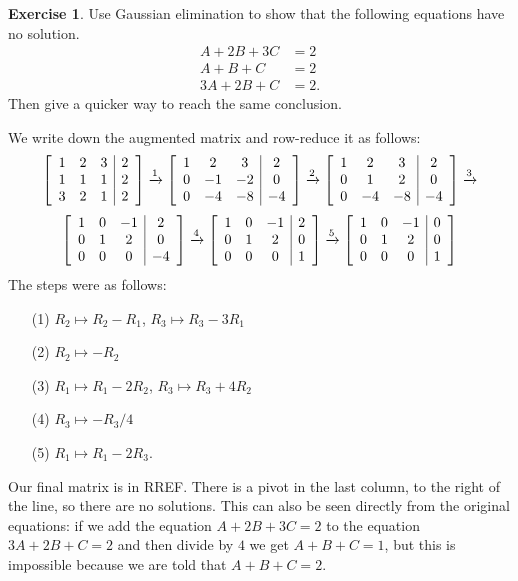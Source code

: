 \documentclass[a4paper]{book}
\theoremstyle{definition}
\newtheorem{exercise}[theorem]{Exercise}
\renewenvironment{solution}{\SolutionInline}{\endSolutionInline}
\begin{document}
\begin{exercise}
 Use Gaussian elimination to show that the following equations have no
 solution. 
 \begin{align*}
  A+2B+3C &= 2 \\
  A+B+C   &= 2 \\
  3A+2B+C &= 2.
 \end{align*}
 Then give a quicker way to reach the same conclusion.
\end{exercise}
\begin{solution}
 We write down the augmented matrix and row-reduce it as follows:
 {\small \[
  \left[\begin{array}{ccc|c}
    1 &  2 &  3 &  2 \\
    1 &  1 &  1 &  2 \\
    3 &  2 &  1 &  2
  \end{array}\right]
  \xrightarrow{1}
  \left[\begin{array}{ccc|c}
    1 &  2 &  3 &  2 \\
    0 & -1 & -2 &  0 \\
    0 & -4 & -8 & -4
  \end{array}\right]
  \xrightarrow{2}
  \left[\begin{array}{ccc|c}
    1 &  2 &  3 &  2 \\
    0 &  1 &  2 &  0 \\
    0 & -4 & -8 & -4
  \end{array}\right]
  \xrightarrow{3}
  \] \[ 
  \left[\begin{array}{ccc|c}
    1 &  0 & -1 &  2 \\
    0 &  1 &  2 &  0 \\
    0 &  0 &  0 & -4
  \end{array}\right]
  \xrightarrow{4}
  \left[\begin{array}{ccc|c}
    1 &  0 & -1 &  2 \\
    0 &  1 &  2 &  0 \\
    0 &  0 &  0 &  1
  \end{array}\right]
  \xrightarrow{5}
  \left[\begin{array}{ccc|c}
    1 &  0 & -1 &  0 \\
    0 &  1 &  2 &  0 \\
    0 &  0 &  0 &  1
  \end{array}\right]
 \]}
 The steps were as follows:
 \begin{itemize}
  \item[(1)] $R_2\mapsto R_2-R_1$, $R_3\mapsto R_3-3R_1$
  \item[(2)] $R_2\mapsto -R_2$
  \item[(3)] $R_1\mapsto R_1-2R_2$, $R_3\mapsto R_3+4R_2$
  \item[(4)] $R_3\mapsto -R_3/4$
  \item[(5)] $R_1\mapsto R_1-2R_3$.
 \end{itemize}
 Our final matrix is in RREF.  There is a pivot in the last column, to
 the right of the line, so there are no solutions.  This can also be
 seen directly from the original equations: if we add the equation
 $A+2B+3C=2$ to the equation $3A+2B+C=2$ and then divide by $4$ we get
 $A+B+C=1$, but this is impossible because we are told that $A+B+C=2$.
\end{solution}
\end{document}
